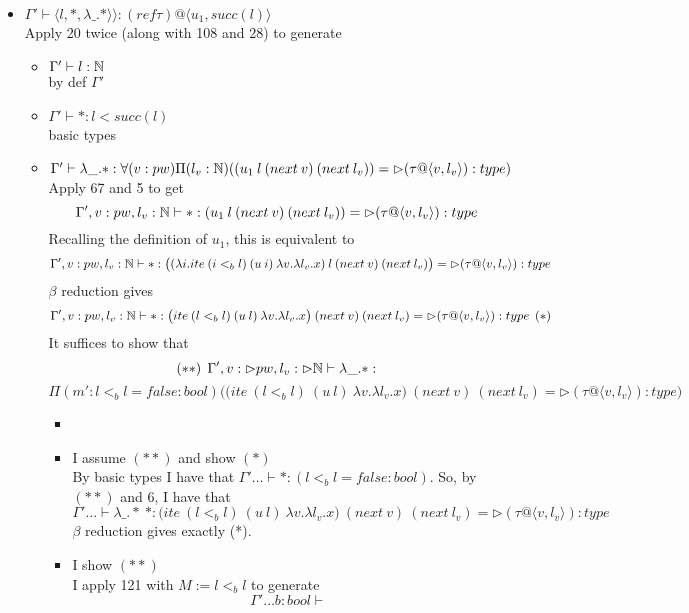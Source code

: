 \documentclass{article}
\begin{document}
\begin{itemize}
\begin{itemize}
    \item $\Gamma' \vdash \langle l, *, \lambda \_. *
\rangle \rangle:  (ref \tau)@\langle u_1, succ(l) \rangle$\\
Apply 20 twice (along with 108 and 28) to generate
\begin{itemize}
    \item $\Gamma' \vdash l : \mathbb{N}$\\
by def $\Gamma'$
    \item $\Gamma' \vdash * : l < succ(l)$\\
    basic types
    \item $\Gamma' \vdash  \lambda \_. *
: \forall(v: pw)\Pi(l_v: \mathbb{N})((u_1 \: l \:  (next \:v) \: (next \: l_v)) = \rhd (\tau @ \langle v, l_v \rangle) : type
)$\\
Apply 67 and 5 to get
\[\Gamma', v: pw, l_v: \mathbb{N} \vdash   *
: (u_1 \: l \:  (next \:v) \: (next \: l_v)) = \rhd (\tau @ \langle v, l_v \rangle) : type
\]
Recalling the definition of $u_1$, this is equivalent to 
\[\Gamma', v: pw, l_v: \mathbb{N} \vdash   *
: \big((\lambda i. ite \: (i <_b l) \: (u \: i) \: \lambda v. \lambda l_v. x) \: l \:  (next \:v) \: (next \: l_v)\big) = \rhd (\tau @ \langle v, l_v \rangle) : type
\]
$\beta$ reduction gives 
\[\Gamma', v: pw, l_v: \mathbb{N} \vdash   *
: \big( ite \: (l <_b l) \: (u \: l) \: \lambda v. \lambda l_v. x \big) \:  (next \:v) \: (next \: l_v) = \rhd (\tau @ \langle v, l_v \rangle) : type \:\: (*)
\]
It suffices to show that
     \[(**)\:\: \Gamma', v: \rhd pw, l_v: \rhd \mathbb{N} \vdash  \lambda \_.* :\]
     \[\Pi(m' : l <_b l = false : bool)\Big(\big( ite \: (l <_b l) \: (u \: l) \: \lambda v. \lambda l_v. x \big) \:  (next \:v) \: (next \: l_v) = \rhd (\tau @ \langle v, l_v \rangle) : type \Big) 
     \]
     \begin{itemize}
     \item
     \item I assume $(**)$ and show $(*)$\\
     By basic types I have that $\Gamma' \dots \vdash * :  (l <_b l = false : bool)$. So, by $(**)$ and 6, I have that 
     \[\Gamma' \dots \vdash \lambda \_.* \: * : 
    \big( ite \: (l <_b l) \: (u \: l) \: \lambda v. \lambda l_v. x \big) \:  (next \:v) \: (next \: l_v) = \rhd (\tau @ \langle v, l_v \rangle) : type
     \]
     $\beta$ reduction gives exactly (*).
     \item I show $(**)$\\
  I apply 121 with $M := l <_b l$ to generate\\
  \[\Gamma' \dots b: bool \vdash 
\]
\end{itemize}
\end{itemize}
\end{itemize}
\end{itemize}
\end{document}
